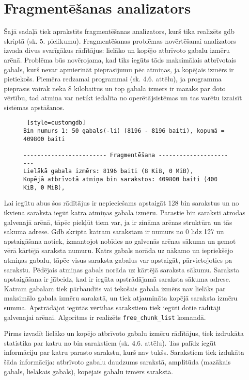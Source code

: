 \section{Fragmentēšanas analizators}
Šajā sadaļā tiek aprakstīts fragmentēšanas analizators, kurš tika realizēts gdb skriptā (sk. 5. pielikumu).
Fragmentēšanas problēmas novērtēšanai analizators izvada divus svarīgākus rādītājus: lielāko un kopējo atbrīvoto gabalu izmēru arēnā.
Problēma būs novērojama, kad tiks iegūts tāds maksimālais atbrīvotais gabals, kurš nevar apmierināt pieprasījumu pēc atmiņas, ja kopējais izmērs ir pietiekošs.
Piemēra redzamai programmai (sk. 4.6. attēlu), ja programma pieprasīs vairāk nekā 8 kilobaitus un top gabala izmērs ir mazāks par doto vērtību, tad atmiņa var netikt iedalīta no operētājsistēmas un tas varētu izraisīt sistēmas apstāšanos.
\begin{figure}[h]
\begin{lstlisting} [style=customgdb]
Bin numurs 1: 50 gabals(-li) (8196 - 8196 baiti), kopumā = 409800 baiti

------------------------ Fragmentēšana -----------------------
Lielākā gabala izmērs: 8196 baiti (8 KiB, 0 MiB),
Kopējā atbrīvotā atmiņa bin sarakstos: 409800 baiti (400 KiB, 0 MiB),
\end{lstlisting}
\caption{\textbf{\fontsize{11}{12}\selectfont {Fragmentēšanas rādītāji}}}
\end{figure}

Lai iegūtu abus šos rādītājus ir nepieciešams apstaigāt 128 bin sarakstus un no ikviena saraksta iegūt katra atmiņas gabala izmēru.
Parastie bin saraksti atrodas galvenajā arēnā, tāpēc piekļūt tiem var, ja ir zināma arēnas struktūra un tās sākuma adrese.
Gdb skriptā katram sarakstam ir numurs no 0 līdz 127 un apstaigāšana notiek, izmantojot nobīdes no galvenās arēnas sākuma un ņemot vērā kārtējā saraksta numuru.
Katrs gabals norāda uz nākamo un iepriekšējo atmiņas gabalu, tāpēc visus saraksta gabalus var apstaigāt, pārvietojoties pa sarakstu.
Pēdējais atmiņas gabals norāda uz kārtējā saraksta sākumu.
Saraksta apstaigāšana ir jābeidz, kad ir iegūta apstrādājamā saraksta sākuma adrese.
Katram gabalam tiek pārbaudīts vai tekošais gabala izmērs nav lielāks par maksimālo gabala izmēru sarakstā, un tiek atjaunināta kopējā saraksta izmēru summa.
Apstrādājot iegūtās vērtības sarakstiem tiek iegūti dotie rādītāji galvenajai arēnai.
Algoritms ir realizēts \texttt{free\_chunk\_list} komandā.

Pirms izvadīt lielāko un kopējo atbrīvoto gabalu izmēru rādītājus, tiek izdrukāta statistika par katru no bin sarakstiem (sk. 4.6. attēlu).
Tas palīdz iegūt informāciju par katru parasto sarakstu, kurš nav tukšs.
Sarakstiem tiek izdukāta šāda informācija: atbrīvoto gabalu daudzums sarakstā, amplitūda (mazākais gabals, lielākais gabals), kopējais gabalu izmērs sarakstā.



